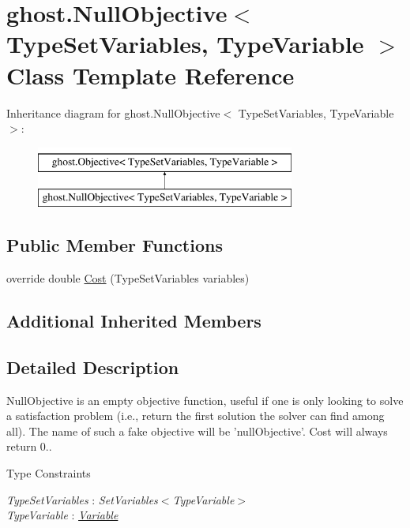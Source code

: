 \hypertarget{classghost_1_1NullObjective_3_01TypeSetVariables_00_01TypeVariable_01_4}{\section{ghost.\-Null\-Objective$<$ Type\-Set\-Variables, Type\-Variable $>$ Class Template Reference}
\label{classghost_1_1NullObjective_3_01TypeSetVariables_00_01TypeVariable_01_4}
}
Inheritance diagram for ghost.\-Null\-Objective$<$ Type\-Set\-Variables, Type\-Variable $>$\-:\begin{figure}[H]
\begin{center}
\leavevmode
\includegraphics[height=2.000000cm]{classghost_1_1NullObjective_3_01TypeSetVariables_00_01TypeVariable_01_4}
\end{center}
\end{figure}
\subsection*{Public Member Functions}
\begin{DoxyCompactItemize}
\item 
override double \hyperlink{classghost_1_1NullObjective_3_01TypeSetVariables_00_01TypeVariable_01_4_a644e5a014d52e576153c362d3c9de538}{Cost} (Type\-Set\-Variables variables)
\end{DoxyCompactItemize}
\subsection*{Additional Inherited Members}


\subsection{Detailed Description}
Null\-Objective is an empty objective function, useful if one is only looking to solve a satisfaction problem (i.\-e., return the first solution the solver can find among all). The name of such a fake objective will be 'null\-Objective'. Cost will always return 0.. \begin{Desc}
\item[Type Constraints]\begin{description}
\item[{\em Type\-Set\-Variables} : {\em Set\-Variables$<$Type\-Variable$>$}]\item[{\em Type\-Variable} : {\em \hyperlink{classghost_1_1Variable}{Variable}}]\end{description}
\end{Desc}


